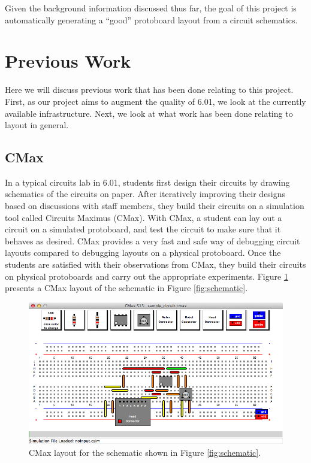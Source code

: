 Given the background information discussed thus far, the goal of this project is
automatically generating a ``good'' protoboard layout from a circuit schematics.

\section{Previous Work}

Here we will discuss previous work that has been done relating to this project.
First, as our project aims to augment the quality of 6.01, we look at the
currently available infrastructure. Next, we look at what work has
been done relating to layout in general.

\subsection{CMax}

In a typical circuits lab in 6.01, students first design their circuits by
drawing schematics of the circuits on paper.
After iteratively improving their designs based on discussions with staff
members, they build their circuits on a simulation tool called Circuits Maximus
(CMax)\cite{cmax}.
With CMax, a student can lay out a circuit on a simulated protoboard, and test
the circuit to make sure that it behaves as desired. CMax provides a very fast
and safe way of debugging circuit layouts compared to debugging layouts on a
physical protoboard. Once the students are satisfied with their
observations from CMax, they build their circuits on physical protoboards and
carry out the appropriate experiments. Figure \ref{fig:cmax_sample} presents a
CMax layout of the schematic in Figure \ref{fig:schematic}.

\begin{figure}
\begin{center}
\includegraphics[width=\textwidth]{Images/sample_circuit.png}
\caption[CMax]{CMax layout for the schematic shown in Figure
\ref{fig:schematic}.}
\label{fig:cmax_sample}
\end{center}
\end{figure}


